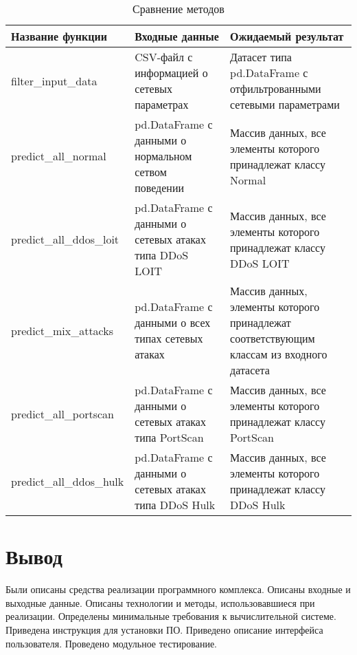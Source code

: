 \begin{center}
    \captionsetup{justification=raggedleft,singlelinecheck=off}
    \begin{longtable}[c]{|P{5cm}|P{6cm}|P{5.5cm}|}
    \caption{Сравнение методов \label{tbl:tests}}
    \\ \hline
        \textbf{Название функции} &
        \textbf{Входные данные} &
        \textbf{Ожидаемый результат} 
    \\ \hline
        filter\_input\_data &
        CSV-файл с информацией о сетевых параметрах &
        Датасет типа pd.DataFrame \cite{pddataframe} с отфильтрованными сетевыми параметрами
    \\ \hline
        predict\_all\_normal &
        pd.DataFrame с данными о нормальном сетвом поведении  &
        Массив данных, все элементы которого принадлежат классу Normal
    \\ \hline
        predict\_all\_ddos\_loit &
        pd.DataFrame с данными о сетевых атаках типа DDoS LOIT &
        Массив данных, все элементы которого принадлежат классу DDoS LOIT
    \\ \hline
        predict\_mix\_attacks &
        pd.DataFrame с данными о всех типах сетевых атаках &
        Массив данных, элементы которого принадлежат соответствующим классам из входного датасета 
    \\ \hline
    predict\_all\_portscan &
    pd.DataFrame с данными о сетевых атаках типа PortScan &
    Массив данных, все элементы которого принадлежат классу PortScan
    \\ \hline
    predict\_all\_ddos\_hulk &
    pd.DataFrame с данными о сетевых атаках типа DDoS Hulk &
    Массив данных, все элементы которого принадлежат классу DDoS Hulk
    \\ \hline
\end{longtable}
\end{center}


\section{Вывод}
Были описаны средства реализации программного комплекса. 
Описаны входные и выходные данные. Описаны технологии и методы, использовавшиеся при реализации.
Определены минимальные требования к вычислительной системе. Приведена инструкция
для установки ПО. Приведено описание интерфейса пользователя. Проведено модульное тестирование.


